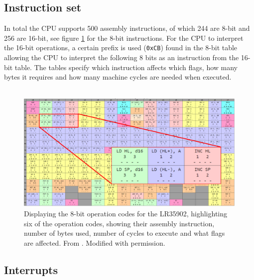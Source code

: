 \subsection{Instruction set}
In total the CPU supports 500 assembly instructions, of which 244 are 8-bit and 256 are 16-bit, see figure \ref{fig:8bitOpCodes} for the 8-bit instructions. For the CPU to interpret the 16-bit operations, a certain prefix is used (\texttt{0xCB}) found in the 8-bit table allowing the CPU to interpret the following 8 bits as an instruction from the 16-bit table. The tables specify which instruction affects which flags, how many bytes it requires and how many machine cycles are needed when executed. 
\\\\
\begin{figure}[H]
    \centering
    \includegraphics[width=\textwidth]{figures/8bitOpCodes.PNG}
    \caption{Displaying the 8-bit operation codes for the LR35902, highlighting six of the operation codes, showing their assembly instruction, number of bytes used, number of cycles to execute and what flags are affected. From \cite{OpCodes}. Modified with permission.}
    \label{fig:8bitOpCodes}
\end{figure}


\subsection{Interrupts}
\label{sub}

